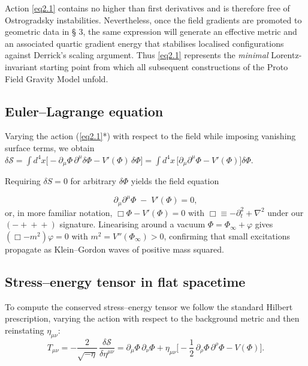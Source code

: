 \documentclass{iopjournal}
\begin{document}
Action \eqref{eq2.1} contains no higher than first derivatives and is therefore free of Ostrogradsky instabilities. Nevertheless, once the field gradients are promoted to geometric data in {\S} 3, the same expression will generate an effective metric and an associated quartic gradient energy that stabilises localised configurations against Derrick's scaling argument. Thus \eqref{eq2.1} represents the \textit{minimal} Lorentz-invariant starting point from which all subsequent constructions of the Proto Field Gravity Model unfold.


\subsection{Euler--Lagrange equation}

Varying the action (\ref{eq2.1}*) with respect to the field while imposing vanishing surface terms, we obtain $\delta\mathcal S =\int d^{4}x \bigl[-\partial_\mu\Phi\,\partial^{\mu}\delta\Phi -V'(\Phi)\,\delta\Phi\bigr] =\int d^{4}x\, \bigl[\partial_\mu\partial^{\mu}\Phi -V'(\Phi)\bigr]\delta\Phi$.

Requiring $\delta S=0 $ for arbitrary $\delta\Phi$ yields the field equation

\begin{equation}\label{eq2}
\partial_\mu\partial^{\mu}\Phi\;-\;V'(\Phi)=0,
\end{equation}
or, in more familiar notation, $\Box\Phi-V'(\Phi)=0$ with $\Box\equiv -\partial_{t}^{2}+\nabla^{2}$ under our $(-+\!+\!+)$ signature. Linearising around a vacuum $\Phi=\Phi_{\infty}+\varphi$ gives $(\Box-m^{2})\varphi=0$ with $m^{2}=V''(\Phi_{\infty})>0$, confirming that small excitations propagate as Klein--Gordon waves of positive mass squared.


\subsection{Stress--energy tensor in flat spacetime}

To compute the conserved stress--energy tensor we follow the standard Hilbert prescription, varying the action with respect to the background metric and then reinstating $\eta_{\mu\nu}$:
\begin{equation}\label{eq2.3}
T_{\mu\nu} =-\frac{2}{\sqrt{-\eta}}\, \frac{\delta\mathcal S}{\delta\eta^{\mu\nu}} =\partial_\mu\Phi\,\partial_\nu\Phi +\eta_{\mu\nu} \bigl[-\frac{1}{2}\,\partial_\rho\Phi\,\partial^{\rho}\Phi -V(\Phi)\bigr].
\end{equation}
\end{document}
